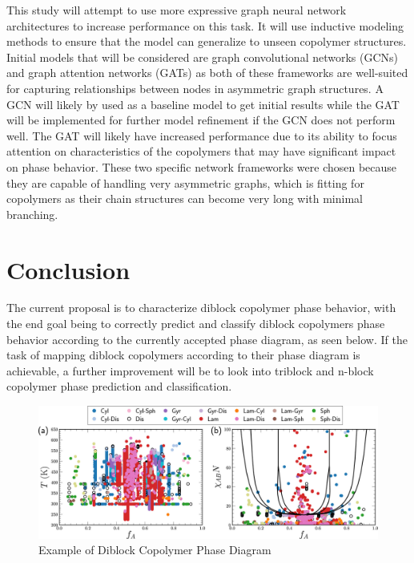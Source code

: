 \documentclass{article}
\begin{document}
This study will attempt to use more expressive graph neural network architectures to increase performance on this task. It will use inductive modeling methods to ensure that the model can generalize to unseen copolymer structures. Initial models that will be considered are graph convolutional networks (GCNs) and graph attention networks (GATs) as both of these frameworks are well-suited for capturing relationships between nodes in asymmetric graph structures. A GCN will likely by used as a baseline model to get initial results while the GAT will be implemented for further model refinement if the GCN does not perform well. The GAT will likely have increased performance due to its ability to focus attention on characteristics of the copolymers that may have significant impact on phase behavior. These two specific network frameworks were chosen because they are capable of handling very asymmetric graphs, which is fitting for copolymers as their chain structures can become very long with minimal branching.

 \section{Conclusion}
The current proposal is to characterize diblock copolymer phase behavior, with the end goal being to correctly predict and classify diblock copolymers phase behavior according to the currently accepted phase diagram, as seen below. If the task of mapping diblock copolymers according to their phase diagram is achievable, a further improvement will be to look into triblock and n-block copolymer phase prediction and classification.

\begin{figure}[h]
\caption{Example of Diblock Copolymer Phase Diagram\cite{RandForest}}
\centering
\includegraphics[width=\textwidth]{template/images_large_mz1c00521_0001.jpeg}
\end{figure}




\end{document}
